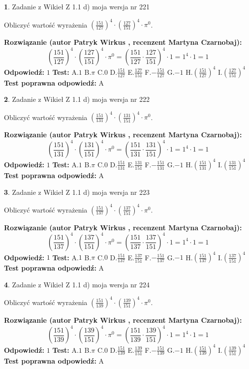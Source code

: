 \documentclass[12pt, a4paper]{article}
\theoremstyle{definition} %
\newtheorem{zad}{}
\newcommand{\zadStart}[1]{\begin{zad}#1\newline}
\newcommand{\zadStop}{\end{zad}}
\newcommand{\rozwStart}[2]{\noindent \textbf{Rozwiązanie (autor #1 , recenzent #2): }\newline}
\newcommand{\rozwStop}{\newline}
\newcommand{\odpStart}{\noindent \textbf{Odpowiedź:}\newline}
\newcommand{\odpStop}{\newline}
\newcommand{\testStart}{\noindent \textbf{Test:}\newline}
\newcommand{\testStop}{\newline}
\newcommand{\kluczStart}{\noindent \textbf{Test poprawna odpowiedź:}\newline}
\newcommand{\kluczStop}{\newline}
\begin{document}
\zadStart{Zadanie z Wikieł Z 1.1 d) moja wersja nr 221}

Obliczyć wartość wyrażenia $(\frac{151}{127})^{4} \cdot (\frac{127}{151})^{4} \cdot \pi^{0}$.
\zadStop
\rozwStart{Patryk Wirkus}{Martyna Czarnobaj}
$$(\frac{151}{127})^{4} \cdot (\frac{127}{151})^{4} \cdot \pi^{0} = (\frac{151}{127} \cdot \frac{127}{151})^{4} \cdot 1 = 1^{4} \cdot 1 = 1$$
\rozwStop
\odpStart
$1$
\odpStop
\testStart
A.$1$ B.$\pi$ C.$0$ D.$\frac{151}{127}$ E.$\frac{127}{151}$
F.$-\frac{151}{127}$ G.$-1$
H.$(\frac{151}{127})^{4}$
I.$(\frac{127}{151})^{4}$
\testStop
\kluczStart
A
\kluczStop



\zadStart{Zadanie z Wikieł Z 1.1 d) moja wersja nr 222}

Obliczyć wartość wyrażenia $(\frac{151}{131})^{4} \cdot (\frac{131}{151})^{4} \cdot \pi^{0}$.
\zadStop
\rozwStart{Patryk Wirkus}{Martyna Czarnobaj}
$$(\frac{151}{131})^{4} \cdot (\frac{131}{151})^{4} \cdot \pi^{0} = (\frac{151}{131} \cdot \frac{131}{151})^{4} \cdot 1 = 1^{4} \cdot 1 = 1$$
\rozwStop
\odpStart
$1$
\odpStop
\testStart
A.$1$ B.$\pi$ C.$0$ D.$\frac{151}{131}$ E.$\frac{131}{151}$
F.$-\frac{151}{131}$ G.$-1$
H.$(\frac{151}{131})^{4}$
I.$(\frac{131}{151})^{4}$
\testStop
\kluczStart
A
\kluczStop



\zadStart{Zadanie z Wikieł Z 1.1 d) moja wersja nr 223}

Obliczyć wartość wyrażenia $(\frac{151}{137})^{4} \cdot (\frac{137}{151})^{4} \cdot \pi^{0}$.
\zadStop
\rozwStart{Patryk Wirkus}{Martyna Czarnobaj}
$$(\frac{151}{137})^{4} \cdot (\frac{137}{151})^{4} \cdot \pi^{0} = (\frac{151}{137} \cdot \frac{137}{151})^{4} \cdot 1 = 1^{4} \cdot 1 = 1$$
\rozwStop
\odpStart
$1$
\odpStop
\testStart
A.$1$ B.$\pi$ C.$0$ D.$\frac{151}{137}$ E.$\frac{137}{151}$
F.$-\frac{151}{137}$ G.$-1$
H.$(\frac{151}{137})^{4}$
I.$(\frac{137}{151})^{4}$
\testStop
\kluczStart
A
\kluczStop



\zadStart{Zadanie z Wikieł Z 1.1 d) moja wersja nr 224}

Obliczyć wartość wyrażenia $(\frac{151}{139})^{4} \cdot (\frac{139}{151})^{4} \cdot \pi^{0}$.
\zadStop
\rozwStart{Patryk Wirkus}{Martyna Czarnobaj}
$$(\frac{151}{139})^{4} \cdot (\frac{139}{151})^{4} \cdot \pi^{0} = (\frac{151}{139} \cdot \frac{139}{151})^{4} \cdot 1 = 1^{4} \cdot 1 = 1$$
\rozwStop
\odpStart
$1$
\odpStop
\testStart
A.$1$ B.$\pi$ C.$0$ D.$\frac{151}{139}$ E.$\frac{139}{151}$
F.$-\frac{151}{139}$ G.$-1$
H.$(\frac{151}{139})^{4}$
I.$(\frac{139}{151})^{4}$
\testStop
\kluczStart
A
\kluczStop
\end{document}
